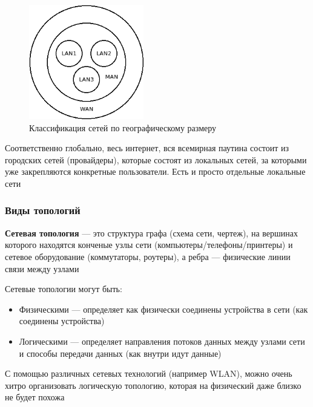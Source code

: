 \documentclass[a4paper]{article}
\begin{document}
\begin{figure}[!h]
	\centering
	\includegraphics[width=5cm]{9-geo-network-types}
	\caption{Классификация сетей по географическому размеру}
	\label{fig:pic-9-geo-network-types}
\end{figure}

Соответственно глобально, весь интернет, вся всемирная паутина состоит из городских сетей (провайдеры), которые состоят из локальных сетей, за которыми уже закрепляются конкретные пользователи. Есть и просто отдельные локальные сети

\subsubsection{Виды топологий}
\textbf{Сетевая топология} --- это структура графа (схема сети, чертеж), на вершинах которого находятся конченые узлы сети (компьютеры/телефоны/принтеры) и сетевое оборудование (коммутаторы, роутеры), а ребра --- физические линии связи между узлами

Сетевые топологии могут быть:
\begin{itemize}
	\item Физическими --- определяет как физически соединены устройства в сети (как соединены устройства)
	\item Логическими --- определяет направления потоков данных между узлами сети и способы передачи данных (как внутри идут данные)
\end{itemize}

С помощью различных сетевых технологий (например WLAN), можно очень хитро организовать логическую топологию, которая на физический даже близко не будет похожа
\end{document}
